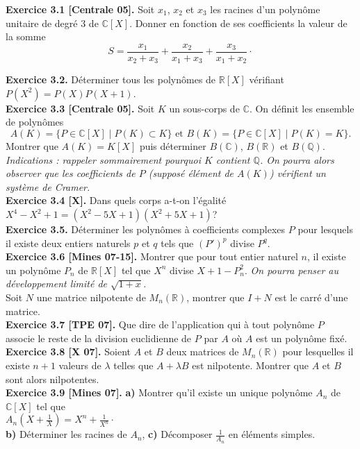 \documentclass[a4paper,12pt,francais]{article}
\newcommand{\field}[1]{\mathbb{#1}}
\newcommand{\R}{\field{R}}
\newcommand{\Q}{\field{Q}}
\newcommand{\C}{\field{C}}
\begin{document}
\noindent
{\bf Exercice 3.1 [Centrale 05].} Soit $x_1$, $x_2$ et $x_3$ les racines
d'un polynôme unitaire de degré $3$ de $\C[X]$. Donner en fonction de
ses coefficients la valeur de la somme 
$$S=\frac{x_1}{x_2+x_3}+
\frac{x_2}{x_1+x_3}+
\frac{x_3}{x_1+x_2} \cdot$$

\noindent
{\bf Exercice 3.2.} Déterminer tous les polynômes de $\R[X]$ vérifiant
$P(X^2)=P(X) P(X+1)$.\\

\noindent
{\bf Exercice 3.3 [Centrale 05].} Soit $K$ un sous-corps de $\C$. On
définit les ensemble de polynômes 
$$A(K)=\{P\in \C[X] \; |\; P(K)\subset K\} \mbox{ et } B(K)=\{P\in
\C[X]\; |\; P(K)=K\}.$$
Montrer que $A(K)=K[X]$ puis déterminer $B(\C)$, $B(\R)$ et $B(\Q)$.\\ 
{\it Indications : rappeler sommairement pourquoi $K$ contient
  $\Q$. On pourra alors observer que les coefficients de $P$ (supposé
  élément de $A(K)$) vérifient un système de Cramer.}\\

\noindent
{\bf Exercice 3.4 [X].} Dans quels corps a-t-on l'égalité
$X^4-X^2+1=(X^2-5X+1)(X^2+5X+1)$?\\

\noindent
{\bf Exercice 3.5.} Déterminer les polynômes à coefficients complexes
$P$ pour lesquels il existe deux entiers naturels $p$ et $q$ tels que
$(P')^p$ divise $P^q$.\\

\noindent
{\bf Exercice 3.6 [Mines 07-15].} %
 Montrer que pour tout entier naturel $n$, il existe un polynôme $P_n$ de $\R[X]$ tel que $X^n$ divise $X+1-P_n^2$. {\it On pourra penser au développement limité de $\sqrt{1+x}$.}\\
Soit $N$ une matrice nilpotente de $M_n(\R)$, montrer que $I+N$ est le carré d'une matrice.\\

\noindent
{\bf Exercice 3.7 [TPE 07].} Que dire de l'application qui à tout polynôme $P$ associe le reste de la division euclidienne de $P$ par $A$ où $A$ est un polynôme fixé.\\

\noindent
{\bf Exercice 3.8 [X 07].} Soient $A$ et $B$ deux matrices de $M_n(\R)$ pour lesquelles il existe $n+1$ valeurs de  $\lambda$ telles que $A+\lambda B$ est nilpotente. Montrer que $A$ et $B$ sont alors nilpotentes.\\

\noindent
{\bf Exercice 3.9 [Mines 07].} {\bf a)} Montrer qu'il existe un unique polynôme $A_n$ de $\C[X]$ tel que\\ $\displaystyle A_n\left( X+\frac{1}{X} \right) = X^n+ \frac{1}{X^n}\cdot$\\
\indent
{\bf b)} Déterminer les racines de $A_n$, 
\indent
{\bf c)} Décomposer $\frac{1}{A_n}$ en éléments simples.\\
\end{document}

